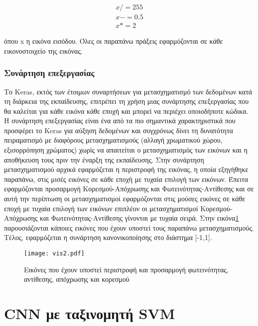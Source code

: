 \begin{equation}
\label{eq:norm}
\begin{split}
x /= 255\\
x -= 0.5\\
x *= 2
\end{split}
\end{equation}

όπου x η εικόνα εισόδου. Όλες οι παραπάνω πράξεις εφαρμόζονται σε κάθε εικονοστοιχείο της εικόνας.



\subsubsection{Συνάρτηση επεξεργασίας}
\label{subsubsec:5.1.2.5}

Το Keras, εκτός των έτοιμων συναρτήσεων για μετασχηματισμό των δεδομένων κατά τη διάρκεια της εκπαίδευσης,  επιτρέπει τη χρήση μιας συνάρτησης επεξεργασίας που θα καλείται για κάθε εικόνα κάθε εποχή και μπορεί να περιέχει οποιοδήποτε κώδικα. 
Η συνάρτηση επεξεργασίας είναι ένα από τα πιο σημαντικά χαρακτηριστικά που προσφέρει το Keras για αύξηση δεδομένων και συγχρόνως δίνει τη δυνατότητα πειραματισμό με διαφόρους μετασχηματισμούς (αλλαγή χρωματικού χώρου, εξισορρόπηση χρώματος) χωρίς να απαιτείται ο μετασχηματισμός των εικόνων και η αποθήκευση τους πριν την έναρξη της εκπαίδευσης. 
Στην συνάρτηση μετασχηματισμού αρχικά εφαρμόζεται η περιστροφή της εικόνας, η οποία εξηγήθηκε παραπάνω, στις μισές εικόνες σε κάθε εποχή με τυχαία επιλογή των εικόνων. Έπειτα εφαρμόζονται προσαρμογή Κορεσμού-Απόχρωσης και Φωτεινότητας-Αντίθεσης και σε αυτή την περίπτωση οι μετασχηματισμοί εφαρμόζονται στις μούσες εικόνες σε κάθε εποχή με τυχαία επιλογή των εικόνων επιπλέον οι μετασχηματισμοί Κορεσμού-Απόχρωσης και Φωτεινότητας-Αντίθεσης γίνονται με τυχαία σειρά. Στην εικόνα\ref{figure:viz2}  παρουσιάζονται κάποιες εικόνες που έχουν υποστεί τους παραπάνω μετασχηματισμούς. Τέλος, εφαρμόζεται η συνάρτηση κανονικοποίησης στο διάστημα [-1,1]. 

\begin{figure}[!h]
    \centering
      \texttt{[image: vis2.pdf]} \caption{Εικόνες που έχουν υποστεί περιστροφή και προσαρμογή φωτεινότητας, αντίθεσης, απόχρωσης και κορεσμού}
\label{figure:viz2}  
\end{figure}




\section{CNN με ταξινομητή SVM}
\label{sec:5.2}


